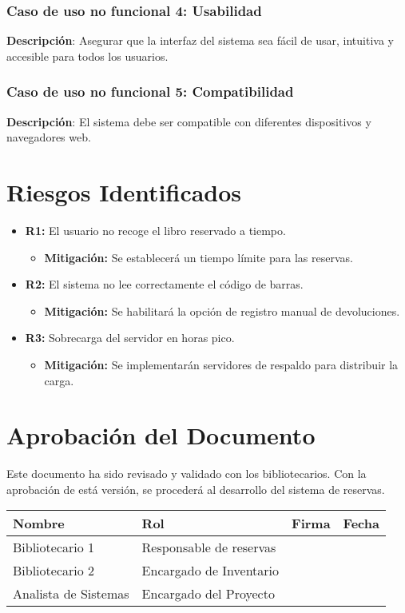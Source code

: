 \documentclass{scrreprt}
\begin{document}
\subsection{Caso de uso no funcional 4: Usabilidad}
\textbf{Descripción}: Asegurar que la interfaz del sistema sea fácil de usar, intuitiva y accesible para todos los usuarios.

\subsection{Caso de uso no funcional 5: Compatibilidad}
\textbf{Descripción}: El sistema debe ser compatible con diferentes dispositivos y navegadores web.



\chapter{Riesgos Identificados}
\begin{itemize}
    \item \textbf{R1:} El usuario no recoge el libro reservado a tiempo.
    \begin{itemize}
        \item \textbf{Mitigación:} Se establecerá un tiempo límite para las reservas.
    \end{itemize}
    \item \textbf{R2:} El sistema no lee correctamente el código de barras.
    \begin{itemize}
        \item \textbf{Mitigación:} Se habilitará la opción de registro manual de devoluciones.
    \end{itemize}
    \item \textbf{R3:} Sobrecarga del servidor en horas pico.
    \begin{itemize}
        \item \textbf{Mitigación:} Se implementarán servidores de respaldo para distribuir la carga.
    \end{itemize}
\end{itemize}

\chapter{Aprobación del Documento}
Este documento ha sido revisado y validado con los bibliotecarios. Con la aprobación de está versión, se procederá al desarrollo del sistema de reservas.

\begin{tabular}{|l|l|l|l|}
    \hline
    \textbf{Nombre} & \textbf{Rol} & \textbf{Firma} & \textbf{Fecha} \\ \hline
    Bibliotecario 1 & Responsable de reservas & & \\ \hline
    Bibliotecario 2 & Encargado de Inventario & & \\ \hline
    Analista de Sistemas & Encargado del Proyecto & & \\ \hline
\end{tabular}
    
\end{document}
